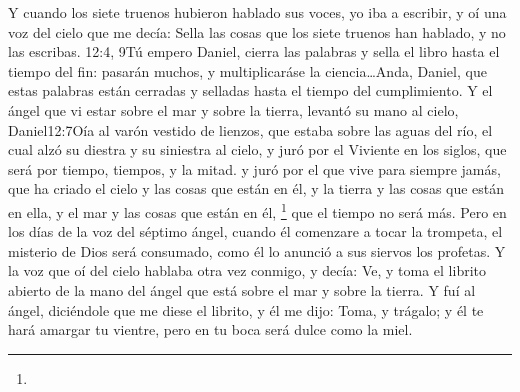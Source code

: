 Y cuando los siete truenos hubieron hablado sus voces, yo iba a escribir, y oí una voz del cielo que me decía: Sella las cosas que los siete truenos han hablado, y no las escribas.%
					{12:4, 9}{Tú empero Daniel, cierra las palabras y sella el libro hasta el tiempo del fin: pasarán muchos, y multiplicaráse la ciencia\ldots Anda, Daniel, que estas palabras están cerradas y selladas hasta el tiempo del cumplimiento.}
Y el ángel que vi estar sobre el mar y sobre la tierra, levantó su mano al cielo,%
					{Daniel}{12:7}{Oía al varón vestido de lienzos, que estaba sobre las aguas del río, el cual alzó su diestra y su siniestra al cielo, y juró por el Viviente en los siglos, que será por tiempo, tiempos, y la mitad.}
y juró por el que vive para siempre jamás, que ha criado el cielo y las cosas que están en él, y la tierra y las cosas que están en ella, y el mar y las cosas que están en él,%
	\footnote{%
	}
 que el tiempo no será más. 
Pero en los días de la voz del séptimo ángel, cuando él comenzare a tocar la trompeta, el misterio de Dios será consumado, como él lo anunció a sus siervos los profetas. 
Y la voz que oí del cielo hablaba otra vez conmigo, y decía: Ve, y toma el librito abierto de la mano del ángel que está sobre el mar y sobre la tierra.
Y fuí al ángel, diciéndole que me diese el librito, y él me dijo: Toma, y trágalo; y él te hará amargar tu vientre, pero en tu boca será dulce como la miel. 

